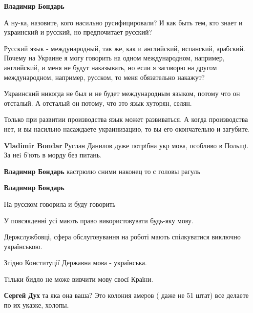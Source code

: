 \begin{itemize}
\begin{itemize}
\textbf{Владимир Бондарь} 

А ну-ка, назовите, кого насильно русифицировали? И как быть тем, кто знает и
украинский и русский, но предпочитает русский?

Русский язык - международный, так же, как и английский, испанский, арабский.
Почему на Украине я могу говорить на одном международном, например, английский,
и меня не будут наказывать, но если я заговорю на другом международном,
например, русском, то меня обязательно накажут?

Украинский никогда не был и не будет международным языком, потому что он
отсталый. А отсталый он потому, что это язык хуторян, селян.

Только при развитии производства язык может развиваться. А когда производства
нет, и вы насильно насаждаете украинизацию, то вы его окончательно и загубите.

\textbf{Vladimir Bondar} Руслан Данилов дуже потрiбна укр мова, особливо в Польщi. За неi б'ють в морду без питань. 🤣

\textbf{Владимир Бондарь} кастрюлю сними наконец то с головы рагуль

\textbf{Владимир Бондарь} 🙈

На русском говорила и буду говорить

\end{itemize}


У повсякденні усі мають право використовувати будь-яку мову.

Держслужбовці, сфера обслуговування на роботі мають спілкуватися виключно
українською.

Згідно Конституції Державна мова - українська.

Тільки бидло не може вивчити мову своєї Країни.



\begin{itemize}
\textbf{Сергей Дух} та яка она ваша? Это колония амеров ( даже не 51 штат) все делаете по их указке, холопы.



\end{itemize}
\end{itemize}
